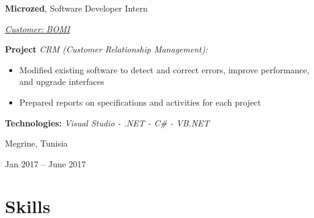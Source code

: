 \documentclass[10pt, a4paper]{article}
\newenvironment{highlights}{
    \begin{itemize}[
        topsep=0.10 cm,
        parsep=0.10 cm,
        partopsep=0pt,
        itemsep=0pt,
        leftmargin=0.4 cm + 10pt
    ]
}{
    \end{itemize}
} %
\newenvironment{twocolentry}[2][]{
    \onecolentry
    \def\secondColumn{#2}
    \setcolumnwidth{\fill, 4.5 cm}
    \begin{paracol}{2}
}{
    \switchcolumn \raggedleft \secondColumn
    \end{paracol}
    \endonecolentry
} %
\begin{document}
        \begin{twocolentry}{
            \fontsize{14}{18}Megrine, Tunisia

        Jan 2017 – June 2017
            \normalsize
        }
            \fontsize{12}{16}
            \textcolor{secondaryColor}{\faBriefcase\hspace{4pt}\textbf{Microzed},} Software Developer Intern
            \normalsize

            \vspace{0.10 cm}
                \vspace{0.10 cm}

                \textcolor{tertiaryColor}{\faAngleDoubleRight\hspace{0.1cm}\underline{\textit{Customer:} \textit{BOMI}}}

                \vspace{0.2cm}
                \textbf{Project \faAngleRight} \textit{CRM (Customer Relationship Management):}

                \begin{highlights}
                        \item Modified existing software to detect and correct errors, improve performance, and upgrade interfaces
                        \item Prepared reports on specifications and activities for each project
                \end{highlights}
                \faBuffer
                \textbf{ Technologies:} \textit{Visual Studio - .NET - C\# - VB.NET}

                \vspace{0.10 cm}

        \end{twocolentry}



    
    \section{Skills}
\end{document}
